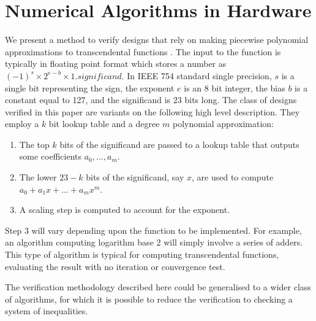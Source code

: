 \documentclass[a4]{article}
\begin{document}
\section{Numerical Algorithms in Hardware}

We present a method to verify designs that rely on making piecewise polynomial approximations to transcendental functions \cite{tang1991table,strollo2011elementary,pineiro2005high}. The input to the function is typically in floating point format \cite{goldberg1991every} which stores a number as $(-1)^{s} \times 2^{e-b} \times 1.\textit{significand}$. In IEEE 754 standard single precision, $s$ is a single bit representing the sign, the exponent $e$ is an 8 bit integer, the bias $b$ is a constant equal to 127, and the significand is 23 bits long. The class of designs verified in this paper are variants on the following high level description. They employ a $k$ bit lookup table and a degree $m$ polynomial approximation:
\begin{enumerate}
\item The top $k$ bits of the significand are passed to a lookup table that outputs some coefficients $a_0,...,a_m$.
\item The lower $23-k$ bits of the significand, say $x$, are used to compute\newline $a_0+a_1x+...+a_mx^m$.
\item A scaling step is computed to account for the exponent.
\end{enumerate} 
Step 3 will vary depending upon the function to be implemented. For example, an algorithm computing logarithm base 2 will simply involve a series of adders. This type of algorithm is typical for computing transcendental functions, evaluating the result with no iteration or convergence test.

The verification methodology described here could be generalised to a wider class of algorithms, for which it is possible to reduce the verification to checking a system of inequalities. 
\end{document}
